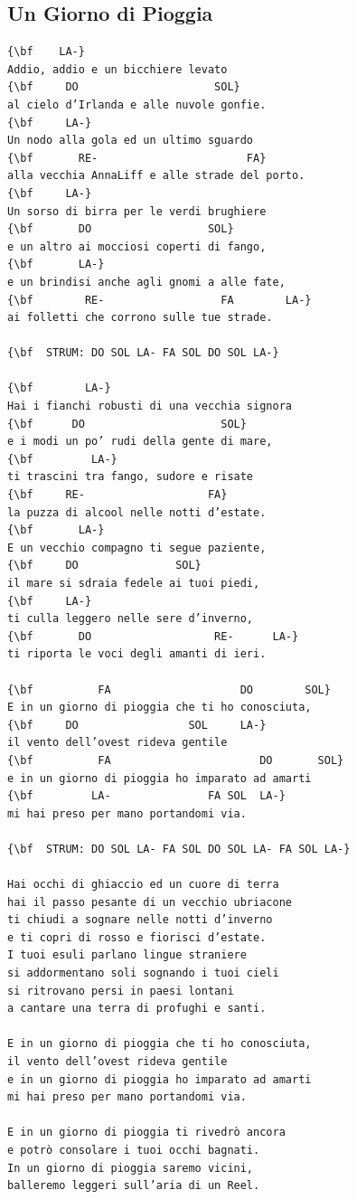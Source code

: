 \documentclass[a4paper]{article}
\begin{document}
\subsection{Un Giorno di Pioggia}
\begin{Verbatim}[commandchars=\\\{\}]
{\bf    LA-}
Addio, addio e un bicchiere levato
{\bf     DO                     SOL}
al cielo d’Irlanda e alle nuvole gonfie.
{\bf     LA-}
Un nodo alla gola ed un ultimo sguardo
{\bf       RE-                       FA}
alla vecchia AnnaLiff e alle strade del porto.
{\bf     LA-}
Un sorso di birra per le verdi brughiere
{\bf       DO                  SOL}
e un altro ai mocciosi coperti di fango,
{\bf       LA-}
e un brindisi anche agli gnomi a alle fate,
{\bf        RE-                  FA        LA-}
ai folletti che corrono sulle tue strade.

{\bf  STRUM: DO SOL LA- FA SOL DO SOL LA-}

{\bf        LA-}
Hai i fianchi robusti di una vecchia signora
{\bf      DO                     SOL}
e i modi un po’ rudi della gente di mare,
{\bf         LA-}
ti trascini tra fango, sudore e risate
{\bf     RE-                   FA}
la puzza di alcool nelle notti d’estate.
{\bf       LA-}
E un vecchio compagno ti segue paziente,
{\bf     DO               SOL}
il mare si sdraia fedele ai tuoi piedi,
{\bf     LA-}
ti culla leggero nelle sere d’inverno,
{\bf       DO                   RE-      LA-}
ti riporta le voci degli amanti di ieri.

{\bf          FA                    DO        SOL}
E in un giorno di pioggia che ti ho conosciuta,
{\bf     DO                 SOL     LA-}
il vento dell’ovest rideva gentile
{\bf          FA                       DO       SOL}
e in un giorno di pioggia ho imparato ad amarti
{\bf         LA-               FA SOL  LA-}
mi hai preso per mano portandomi via.

{\bf  STRUM: DO SOL LA- FA SOL DO SOL LA- FA SOL LA-}

Hai occhi di ghiaccio ed un cuore di terra
hai il passo pesante di un vecchio ubriacone
ti chiudi a sognare nelle notti d’inverno
e ti copri di rosso e fiorisci d’estate.
I tuoi esuli parlano lingue straniere
si addormentano soli sognando i tuoi cieli
si ritrovano persi in paesi lontani
a cantare una terra di profughi e santi.

E in un giorno di pioggia che ti ho conosciuta,
il vento dell’ovest rideva gentile
e in un giorno di pioggia ho imparato ad amarti
mi hai preso per mano portandomi via.

E in un giorno di pioggia ti rivedrò ancora
e potrò consolare i tuoi occhi bagnati.
In un giorno di pioggia saremo vicini,
balleremo leggeri sull’aria di un Reel.

\end{Verbatim}
\newpage
\end{document}
